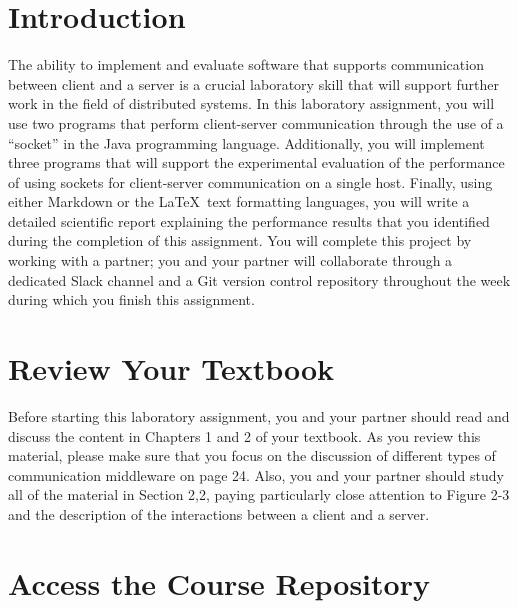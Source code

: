 


\usepackage[compact]{titlesec}



\section*{Introduction}

The ability to implement and evaluate software that supports communication between client and a server is a crucial
laboratory skill that will support further work in the field of distributed systems. In this laboratory assignment, you
will use two programs that perform client-server communication through the use of a ``socket'' in the Java programming
language. Additionally, you will implement three programs that will support the experimental evaluation of the
performance of using sockets for client-server communication on a single host. Finally, using either Markdown or the
\LaTeX~text formatting languages, you will write a detailed scientific report explaining the performance results that
you identified during the completion of this assignment. You will complete this project by working with a partner; you
and your partner will collaborate through a dedicated Slack channel and a Git version control repository throughout the
week during which you finish this assignment.

\section*{Review Your Textbook}

Before starting this laboratory assignment, you and your partner should read and discuss the content in Chapters 1 and 2
of your textbook. As you review this material, please make sure that you focus on the discussion of different types of
communication middleware on page 24. Also, you and your partner should study all of the material in Section 2,2, paying
particularly close attention to Figure 2-3 and the description of the interactions between a client and a server.

\section*{Access the Course Repository}

